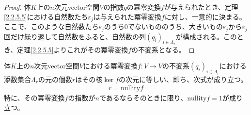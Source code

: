 \documentclass[dvipdfmx]{jsarticle}
\begin{document}
\begin{proof}
体$K$上の$n$次元vector空間$V$の指数$q$の冪零変換$f$が与えられたとき、定理\ref{2.2.5.5}における自然数たち$\varepsilon_{j}$は与えられた冪零変換$f$に対し、一意的に決まる。ここで、このような自然数たち$\varepsilon_{j}$のうち$0$でないもののうち、大きいもの$\varepsilon_{j}$から$\varepsilon_{j}$回だけ繰り返して自然数をふると、自然数の列$\left( q_{i} \right)_{i \in \varLambda_{r}}$が構成される。このとき、定理\ref{2.2.5.5}よりこれがその冪零変換$f$の不変系となる。
\end{proof}
\begin{thm}\label{2.2.5.7}
体$K$上の$n$次元vector空間$V$における冪零変換$f:V \rightarrow V$の不変系$\left( q_{i} \right)_{i \in \varLambda_{r}}$における添数集合$\varLambda_{r}$の元の個数$r$はその核$\ker f$の次元に等しい、即ち、次式が成り立つ。
\begin{align*}
r = {\mathrm{nullity}}f
\end{align*}
特に、その冪零変換$f$の指数が$n$であるならそのときに限り、${\mathrm{nullity}}f = 1$が成り立つ。
\end{thm}
\end{document}
